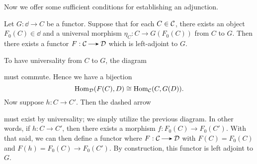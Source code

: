     Now we offer some sufficient conditions for establishing an
    adjunction. 
    \begin{proposition}
        Let $G: \dd \to C$ be a functor. Suppose that for each $C \in \mathcal{C}$,
        there exists an object $F_0(C) \in \dd$ and a universal morphism
        $\eta_C: C \to G(F_0(C))$ from $C$ to $G$. 
        Then there exists a functor $F: \cc \to \dd$ which is left-adjoint 
        to $G$.
    \end{proposition}

    \begin{prf}
        To have universality from $C$ to $G$, the diagram 
        \begin{center}
            \hspace{1cm}
        \end{center}
        must commute. Hence we have a bijection 
        \[
            \operatorname{\mathrm{Hom}}_{\mathcal{D}}({F(C), D}) \cong \operatorname{\mathrm{Hom}}_{\mathcal{C}}({C, G(D)}).  
        \]
        Now suppose $h: C \to C'$. Then the dashed arrow 
        \begin{center}
        \end{center}
        must exist by universality; we simply utilize the previous
        diagram. In other words, if $h: C \to C'$, then there exists a
        morphism $f: F_0(C) \to F_0(C')$. With that said, we can then
        define a functor where
        $F: \cc \to \dd$ with $F(C) = F_0(C)$ and $F(h) = F_0(C) \to
        F_0(C')$. By construction, this functor is left adjoint to $G$. 
    \end{prf}
    
